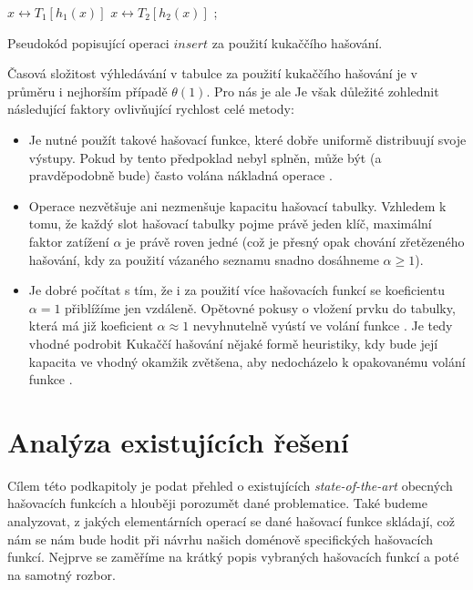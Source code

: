 \begin{algorithm}
\begin{algorithmic}
	\Repeat
		\State $x \leftrightarrow T_1[h_1(x)]$
		 \Return \EndIf
		\State $x \leftrightarrow T_2[h_2(x)]$
		 \Return \EndIf
	\State {}; 
\EndFunction
\end{algorithmic}
\caption{Pseudokód popisující operaci $insert$ za použití kukaččího hašování.}
\label{alg:cuckoo_hashing}
\end{algorithm}

Časová složitost výhledávání v tabulce za použití kukaččího hašování je v průměru i nejhorším případě $\theta(1)$. Pro nás je ale
Je však důležité zohlednit následující faktory ovlivňující rychlost celé metody:
\begin{itemize}
	\item Je nutné použít takové hašovací funkce, které dobře uniformě distribuují svoje výstupy. Pokud by tento
	předpoklad nebyl splněn, může být (a pravděpodobně bude) často volána nákladná operace .

	\item Operace  nezvětšuje ani nezmenšuje kapacitu hašovací tabulky. Vzhledem k tomu, že každý slot
	hašovací tabulky pojme právě jeden klíč, maximální faktor zatížení $\alpha$ je právě roven jedné (což je přesný
	opak chování zřetězeného hašování, kdy za použití vázaného seznamu snadno dosáhneme $\alpha \geq 1$).

	\item Je dobré počítat s tím, že i za použití více hašovacích funkcí se koeficientu $\alpha = 1$ přiblížíme jen
	vzdáleně. Opětovné pokusy o vložení prvku do tabulky, která má již koeficient $\alpha \approx 1$ nevyhnutelně
	vyústí ve volání funkce . Je tedy vhodné podrobit Kukaččí hašování nějaké formě heuristiky, kdy
	bude její kapacita ve vhodný okamžik zvětšena, aby nedocházelo k opakovanému volání funkce .
\end{itemize}

\section{Analýza existujících řešení}
Cílem této podkapitoly je podat přehled o existujících \textit{state-of-the-art} obecných hašovacích funkcích a hlouběji
porozumět dané problematice. Také budeme analyzovat, z jakých elementárních operací se 
dané hašovací funkce skládají, což nám se nám bude hodit při návrhu našich doménově specifických hašovacích funkcí.
Nejprve se zaměříme na krátký popis vybraných hašovacích funkcí a poté na samotný rozbor.

